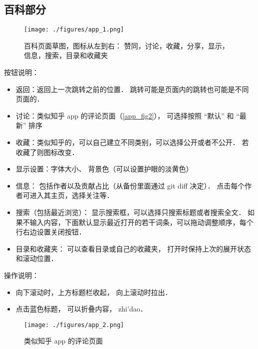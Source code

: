 
\subsection{百科部分}
\begin{figure}[ht]
\centering
\texttt{[image: ./figures/app\_1.png]}
\caption{百科页面草图，图标从左到右： 赞同，讨论，收藏，分享，显示，信息，搜索，目录和收藏夹}\label{app_fig1}
\end{figure}

按钮说明：
\begin{itemize}
\item 返回：返回上一次跳转之前的位置． 跳转可能是页面内的跳转也可能是不同页面的．
\item 讨论：类似知乎 app 的评论页面（\autoref{app_fig2}）， 可选择按照 “默认” 和 “最新” 排序
\item 收藏：类似知乎的，可以自己建立不同类别，可以选择公开或者不公开． 若收藏了则图标改变．
\item 显示设置：字体大小、 背景色（可以设置护眼的淡黄色）
\item 信息： 包括作者以及贡献占比（从备份里面通过 git diff 决定）． 点击每个作者可进入其主页，选择关注等．
\item 搜索（包括最近浏览）： 显示搜索框，可以选择只搜索标题或者搜索全文． 如果不输入内容，下面默认显示最近打开的若干词条，可以拖动调整顺序，每个行右边设置关闭按钮．
\item 目录和收藏夹： 可以查看目录或自己的收藏夹， 打开时保持上次的展开状态和滚动位置．
\end{itemize}

操作说明：
\begin{itemize}
\item 向下滚动时，上方标题栏收起， 向上滚动时拉出．
\item 点击蓝色标题， 可以折叠内容， zhi'dao．
\end{itemize}


\begin{figure}[ht]
\centering
\texttt{[image: ./figures/app\_2.png]}
\caption{类似知乎 app 的评论页面} \label{app_fig2}
\end{figure}
